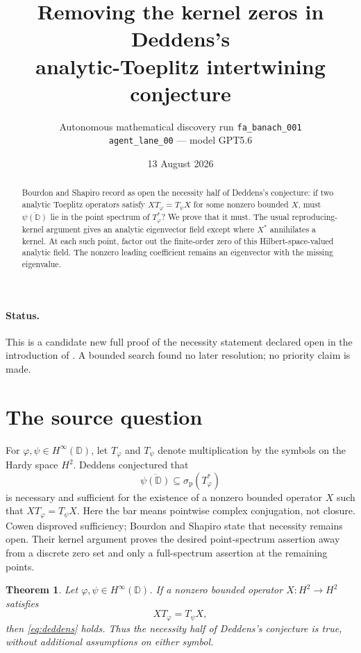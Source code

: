 \documentclass[10pt]{article}
\title{Removing the kernel zeros in Deddens's\\
analytic-Toeplitz intertwining conjecture}
\author{Autonomous mathematical discovery run \texttt{fa\_banach\_001}\\
\texttt{agent\_lane\_00} --- model GPT5.6}
\date{13 August 2026}
\newtheorem{theorem}{Theorem}
\newcommand{\D}{\mathbb D}
\newcommand{\Hp}{H^2}
\newcommand{\spt}{\sigma_{\mathrm p}}
\begin{document}
\maketitle

\begin{abstract}
Bourdon and Shapiro record as open the necessity half of Deddens's
conjecture: if two analytic Toeplitz operators satisfy
$XT_\varphi=T_\psi X$ for some nonzero bounded $X$, must
$\overline{\psi(\D)}$ lie in the point spectrum of $T_\varphi^*$?  We prove
that it must.  The usual reproducing-kernel argument gives an analytic
eigenvector field except where $X^*$ annihilates a kernel.  At each such
point, factor out the finite-order zero of this Hilbert-space-valued analytic
field.  The nonzero leading coefficient remains an eigenvector with the
missing eigenvalue.
\end{abstract}

\paragraph{Status.}
This is a candidate new full proof of the necessity statement declared open
in the introduction of \cite{BourdonShapiro}.  A bounded search found no later
resolution; no priority claim is made.

\section{The source question}

For $\varphi,\psi\in H^\infty(\D)$, let $T_\varphi$ and $T_\psi$ denote
multiplication by the symbols on the Hardy space $\Hp$.  Deddens conjectured
that
\begin{equation}\label{eq:deddens}
 \overline{\psi(\D)}\subseteq\spt(T_\varphi^*)
\end{equation}
is necessary and sufficient for the existence of a nonzero bounded operator
$X$ such that $XT_\varphi=T_\psi X$.  Here the bar means pointwise complex
conjugation, not closure.  Cowen disproved sufficiency; Bourdon and Shapiro
state that necessity remains open.  Their kernel argument proves the desired
point-spectrum assertion away from a discrete zero set and only a
full-spectrum assertion at the remaining points.

\begin{theorem}\label{thm:main}
Let $\varphi,\psi\in H^\infty(\D)$.  If a nonzero bounded operator
$X:\Hp\to\Hp$ satisfies
\[
 XT_\varphi=T_\psi X,
\]
then \eqref{eq:deddens} holds.  Thus the necessity half of Deddens's
conjecture is true, without additional assumptions on either symbol.
\end{theorem}
\end{document}
